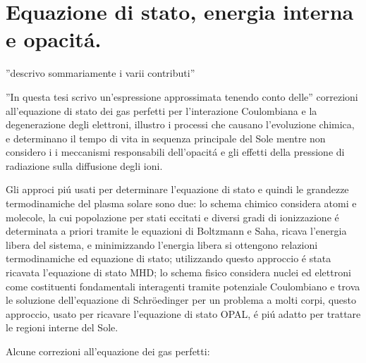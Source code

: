 \documentclass[../main.tex]{subfiles}
\begin{document}
\section{Equazione di stato, energia interna e opacit\'a.}


''descrivo sommariamente i varii contributi''

''In questa tesi scrivo un'espressione approssimata tenendo conto delle'' correzioni all'equazione di stato dei gas perfetti per l'interazione Coulombiana e la degenerazione degli elettroni, illustro i processi che causano l'evoluzione chimica, e determinano il tempo di vita in sequenza principale del Sole mentre non considero i i meccanismi responsabili dell'opacit\'a e gli effetti della pressione di radiazione sulla diffusione degli ioni.



\begingroup
\color{midnightblue}


Gli approci pi\'u usati per determinare l'equazione di stato e quindi le grandezze termodinamiche del plasma solare sono due: lo schema chimico considera atomi e molecole, la cui popolazione per stati eccitati e diversi gradi di ionizzazione \'e determinata a priori tramite le equazioni di Boltzmann e Saha, ricava l'energia libera del sistema, e minimizzando l'energia libera si ottengono relazioni termodinamiche ed equazione di stato; utilizzando questo approccio \'e stata ricavata l'equazione di stato MHD; lo schema fisico considera nuclei ed elettroni come costituenti fondamentali interagenti tramite potenziale Coulombiano e trova le soluzione dell'equazione di Schr\"oedinger per un problema a molti corpi, questo approccio, usato per ricavare l'equazione di stato OPAL, \'e pi\'u adatto per trattare le regioni interne del Sole.



Alcune correzioni all'equazione dei gas perfetti:
\end{document}
